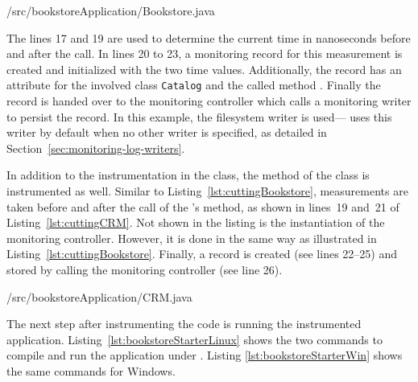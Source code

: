 
\setJavaCodeListing
%
{\manualInstrumentedBookstoreApplicationDir/src/bookstoreApplication/Bookstore.java}
 
\noindent The lines 17 and 19 are used to determine the current time in nanoseconds before and after the  call. In lines 20 to 23, a monitoring record for this measurement is created and initialized with the two time values. Additionally, the record has an attribute for the involved class \verb!Catalog! and the called method . Finally the record is handed over to the monitoring controller which calls a monitoring writer to persist the record. %
In this example, the filesystem writer is used---\Kieker{} uses this writer by default when no other writer is specified, %
as detailed in Section~\ref{sec:monitoring-log-writers}. %

In addition to the instrumentation in the  class, the  method of the  class is instrumented as well. Similar to Listing~\ref{lst:cuttingBookstore}, measurements are taken before and after the call of the 's  method, as shown in %
lines~19 and~21 of Listing~\ref{lst:cuttingCRM}. Not shown in the listing is the instantiation of the monitoring controller. However, it is done in the same way as illustrated in Listing~\ref{lst:cuttingBookstore}. %
Finally, a record is created (see lines 22--25) and stored by calling the monitoring controller (see line 26).

\setJavaCodeListing
%
{\manualInstrumentedBookstoreApplicationDir/src/bookstoreApplication/CRM.java}

\noindent %
The next step after instrumenting the code is running the instrumented application. Listing~\ref{lst:bookstoreStarterLinux} shows the two commands to compile and run the application under \UnixLikeSystems{}. Listing \ref{lst:bookstoreStarterWin} shows the same commands for Windows.

